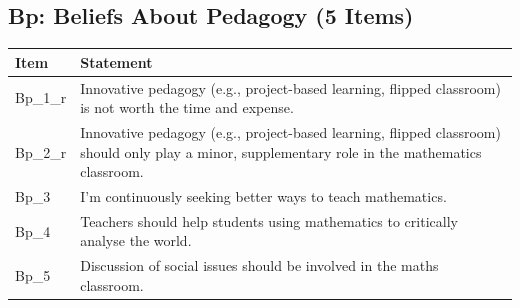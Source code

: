 \documentclass[
  man,
  floatsintext,
  longtable,
  nolmodern,
  notxfonts,
  notimes,
  colorlinks=true,linkcolor=blue,citecolor=blue,urlcolor=blue]{apa7}
\begin{document}
\normalsize

\subsection{Bp: Beliefs About Pedagogy (5
Items)}\label{bp-beliefs-about-pedagogy-5-items}

\begin{table}

{\caption{{Beliefs about pedagogy items.}{\label{tbl-item-bp}}}
\vspace{-20pt}}

\begin{longtable}[]{@{}
  >{\raggedright\arraybackslash}p{}
  >{\raggedright\arraybackslash}p{}@{}}
\toprule\noalign{}
\begin{minipage}[b]{\linewidth}\raggedright
Item
\end{minipage} & \begin{minipage}[b]{\linewidth}\raggedright
Statement
\end{minipage} \\
\midrule\noalign{}
\endhead
\bottomrule\noalign{}
\endlastfoot
Bp\_1\_r & Innovative pedagogy (e.g., project-based learning, flipped
classroom) is not worth the time and expense. \\
Bp\_2\_r & Innovative pedagogy (e.g., project-based learning, flipped
classroom) should only play a minor, supplementary role in the
mathematics classroom. \\
Bp\_3 & I'm continuously seeking better ways to teach mathematics. \\
Bp\_4 & Teachers should help students using mathematics to critically
analyse the world. \\
Bp\_5 & Discussion of social issues should be involved in the maths
classroom. \\
\end{longtable}

\end{table}

\normalsize
\end{document}
